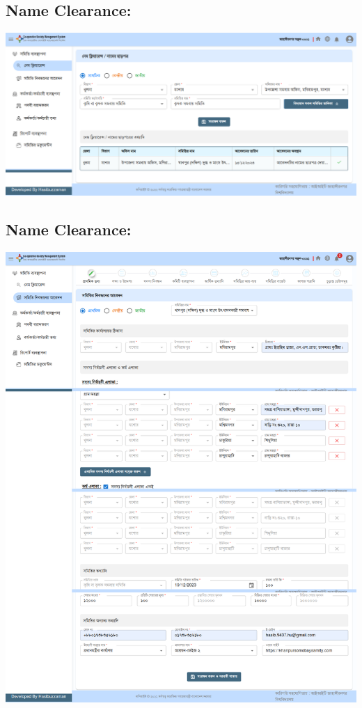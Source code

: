 \subsection{Name Clearance:}
  \includegraphics[width=14cm]{Chap4/5.png}

\subsection{Name Clearance:}
  \includegraphics[width=14cm]{Chap4/6.png}